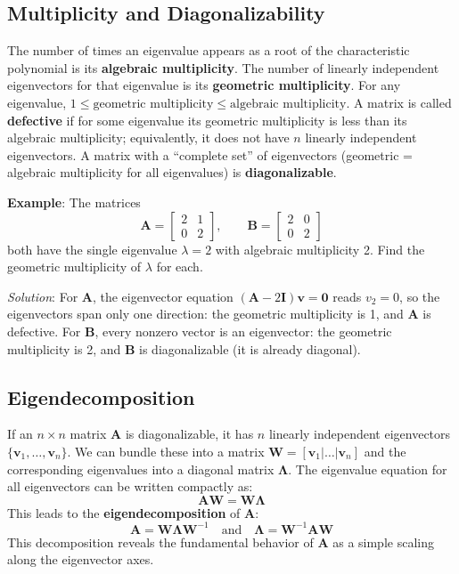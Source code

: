 \subsection{Multiplicity and Diagonalizability}

The number of times an eigenvalue appears as a root of the characteristic polynomial is its \textbf{algebraic multiplicity}. The number of linearly independent eigenvectors for that eigenvalue is its \textbf{geometric multiplicity}. For any eigenvalue, $1 \le \text{geometric multiplicity} \le \text{algebraic multiplicity}$. A matrix is called \textbf{defective} if for some eigenvalue its geometric multiplicity is less than its algebraic multiplicity; equivalently, it does not have \(n\) linearly independent eigenvectors. A matrix with a ``complete set'' of eigenvectors (geometric = algebraic multiplicity for all eigenvalues) is \textbf{diagonalizable}.

\begin{exampleBox}
    \textbf{Example}: The matrices
    \begin{equation*}
        \mathbf{A} = \begin{bmatrix} 2 & 1 \\ 0 & 2 \end{bmatrix},
        \qquad
        \mathbf{B} = \begin{bmatrix} 2 & 0 \\ 0 & 2 \end{bmatrix}
    \end{equation*}
    both have the single eigenvalue $\lambda = 2$ with algebraic multiplicity 2. Find the geometric multiplicity of $\lambda$ for each.

    \emph{Solution}: For $\mathbf{A}$, the eigenvector equation $(\mathbf{A} - 2\mathbf{I})\mathbf{v} = \mathbf{0}$ reads $v_2 = 0$, so the eigenvectors span only one direction: the geometric multiplicity is 1, and $\mathbf{A}$ is defective.
    For $\mathbf{B}$, every nonzero vector is an eigenvector: the geometric multiplicity is 2, and $\mathbf{B}$ is diagonalizable (it is already diagonal).
\end{exampleBox}

\subsection{Eigendecomposition}
If an $n \times n$ matrix $\mathbf{A}$ is diagonalizable, it has $n$ linearly independent eigenvectors $\{\mathbf{v}_1, \dots, \mathbf{v}_n\}$. We can bundle these into a matrix $\mathbf{W} = [\mathbf{v}_1 | \dots | \mathbf{v}_n]$ and the corresponding eigenvalues into a diagonal matrix $\mathbf{\Lambda}$. The eigenvalue equation for all eigenvectors can be written compactly as:
$$ \mathbf{A}\mathbf{W} = \mathbf{W}\mathbf{\Lambda} $$
This leads to the \textbf{eigendecomposition} of $\mathbf{A}$:
$$ \mathbf{A} = \mathbf{W} \mathbf{\Lambda} \mathbf{W}^{-1} \quad \text{and} \quad \mathbf{\Lambda} = \mathbf{W}^{-1} \mathbf{A} \mathbf{W} $$
This decomposition reveals the fundamental behavior of $\mathbf{A}$ as a simple scaling along the eigenvector axes.

